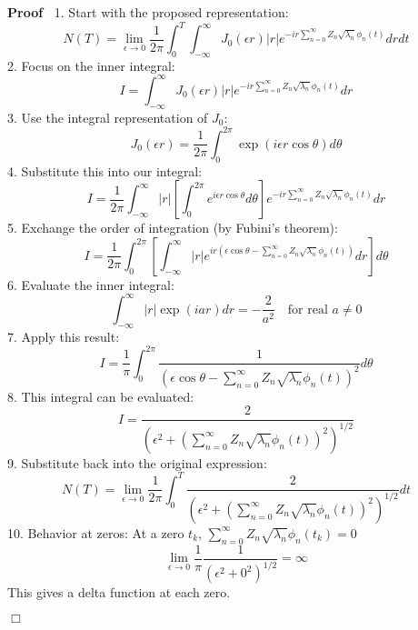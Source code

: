 \documentclass{article}
\newenvironment{proof}{\noindent\textbf{Proof\ }}{\hspace*{\fill}$\Box$\medskip}
\begin{document}
\begin{proof}
  1. Start with the proposed representation:
  \begin{equation}
    N (T) = \lim_{\epsilon \to 0}  \frac{1}{2 \pi}  \int_0^T \int_{-
    \infty}^{\infty} J_0  (\epsilon r) |r| e^{- ir \sum_{n = 0}^{\infty} Z_n 
    \sqrt{\lambda_n} \phi_n (t)} drdt
  \end{equation}
  2. Focus on the inner integral:
  \begin{equation}
    I = \int_{- \infty}^{\infty} J_0  (\epsilon r) |r| e^{- ir \sum_{n =
    0}^{\infty} Z_n  \sqrt{\lambda_n} \phi_n (t)} dr
  \end{equation}
  3. Use the integral representation of $J_0$:
  \begin{equation}
    J_0  (\epsilon r) = \frac{1}{2 \pi}  \int_0^{2 \pi} \exp (i \epsilon r
    \cos \theta) d \theta
  \end{equation}
  4. Substitute this into our integral:
  \begin{equation}
    I = \frac{1}{2 \pi}  \int_{- \infty}^{\infty} |r| \left[ \int_0^{2 \pi}
    e^{i \epsilon r \cos \theta} d \theta \right] e^{- ir \sum_{n =
    0}^{\infty} Z_n  \sqrt{\lambda_n} \phi_n (t)} dr
  \end{equation}
  5. Exchange the order of integration (by Fubini's theorem):
  \begin{equation}
    I = \frac{1}{2 \pi}  \int_0^{2 \pi} \left[ \int_{- \infty}^{\infty}
    |r|e^{ir (\epsilon \cos \theta - \sum_{n = 0}^{\infty} Z_n 
    \sqrt{\lambda_n} \phi_n (t))} dr \right] d \theta
  \end{equation}
  6. Evaluate the inner integral:
  \begin{equation}
    \int_{- \infty}^{\infty} |r| \exp (iar) dr = - \frac{2}{a^2}  \quad
    \text{for real } a \neq 0
  \end{equation}
  7. Apply this result:
  \begin{equation}
    I = \frac{1}{\pi}  \int_0^{2 \pi} \frac{1}{(\epsilon \cos \theta - \sum_{n
    = 0}^{\infty} Z_n  \sqrt{\lambda_n} \phi_n (t))^2} d \theta
  \end{equation}
  8. This integral can be evaluated:
  \begin{equation}
    I = \frac{2}{(\epsilon^2 + (\sum_{n = 0}^{\infty} Z_n  \sqrt{\lambda_n}
    \phi_n (t))^2)^{1 / 2}}
  \end{equation}
  9. Substitute back into the original expression:
  \begin{equation}
    N (T) = \lim_{\epsilon \to 0}  \frac{1}{2 \pi}  \int_0^T
    \frac{2}{(\epsilon^2 + (\sum_{n = 0}^{\infty} Z_n  \sqrt{\lambda_n} \phi_n
    (t))^2)^{1 / 2}} dt
  \end{equation}
  10. Behavior at zeros: At a zero $t_k$, $\sum_{n = 0}^{\infty} Z_n 
  \sqrt{\lambda_n} \phi_n (t_k) = 0$
  \begin{equation}
    \lim_{\epsilon \to 0}  \frac{1}{\pi}  \frac{1}{(\epsilon^2 + 0^2)^{1 / 2}}
    = \infty
  \end{equation}
  This gives a delta function at each zero.
  

\end{proof}
\end{document}
